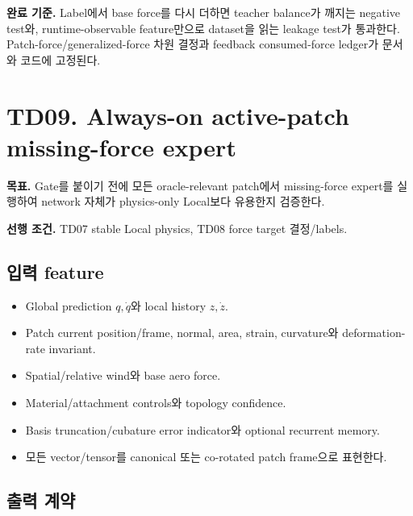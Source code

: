 \documentclass[10pt,a4paper]{article}
\newcommand{\todo}{\textcolor{TodoGray}{\(\square\)}}
\begin{document}
\textbf{완료 기준.}
Label에서 base force를 다시 더하면 teacher balance가 깨지는 negative test와,
runtime-observable feature만으로 dataset을 읽는 leakage test가 통과한다.
Patch-force/generalized-force 차원 결정과 feedback consumed-force ledger가 문서와 코드에 고정된다.

\section{TD09. Always-on active-patch missing-force expert}

\textbf{목표.}
Gate를 붙이기 전에 모든 oracle-relevant patch에서 missing-force expert를 실행하여 network 자체가 physics-only Local보다 유용한지 검증한다.

\textbf{선행 조건.} TD07 stable Local physics, TD08 force target 결정/labels.

\subsection*{입력 feature}

\begin{itemize}
  \item[\todo] Global prediction \(q,\dot q\)와 local history \(z,\dot z\).
  \item[\todo] Patch current position/frame, normal, area, strain, curvature와 deformation-rate invariant.
  \item[\todo] Spatial/relative wind와 base aero force.
  \item[\todo] Material/attachment controls와 topology confidence.
  \item[\todo] Basis truncation/cubature error indicator와 optional recurrent memory.
  \item[\todo] 모든 vector/tensor를 canonical 또는 co-rotated patch frame으로 표현한다.
\end{itemize}

\subsection*{출력 계약}
\end{document}
